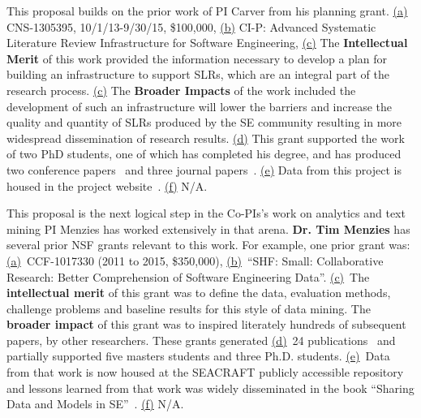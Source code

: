 This proposal builds on the prior work of PI Carver from his planning grant. 
\underline{(a)} CNS-1305395, 10/1/13-9/30/15, \$100,000, 
\underline{(b)} CI-P: Advanced Systematic Literature Review Infrastructure for Software Engineering,
\underline{(c)} The \textbf{Intellectual Merit} of this work provided the information necessary to develop a plan for building an infrastructure to support SLRs, which are an integral part of the research process.
\underline{(c)} The \textbf{Broader Impacts} of the work included the development of such an infrastructure will lower the barriers and increase the quality and quantity of SLRs produced by the SE community resulting in more widespread dissemination of research results.
\underline{(d)} This grant supported the work of two PhD students, one of which has completed his degree, and has produced two conference papers~\cite{Carver-etal:13, Hassler-etal:14} and three journal papers~\cite{Hassler-etal:16,AlZubidy-etal:2017,Al-Zubidy2019}.
\underline{(e)} Data from this project is housed in the project website~\cite{workshop}.
\underline{(f)} N/A.


This proposal is the next logical step in the Co-PIs's work on analytics and text mining
{PI Menzies} has worked extensively in that arena.
\textbf{Dr. Tim Menzies} has several prior NSF  grants relevant to this work.  
For example, one  prior grant was:
 \underline{(a)}~CCF-1017330 (2011 to 2015,  \$350,000),
\underline{(b)}~``SHF: Small: Collaborative Research: Better Comprehension of Software Engineering Data''. 
\underline{(c)}~The {\bf intellectual merit} of this  grant
was  to define the data, evaluation methods, challenge problems and baseline results for this style of data mining.  The {\bf broader impact} of this  grant was to  inspired literately hundreds of subsequent papers,
 by other researchers.
These  grants generated \underline{(d)}~24 publications~\cite{%
Bavota2012a,%
Bavota2013,%
Bavota2012b,%
Haiduc2010a,%
Haiduc2013a,%
Haiduc2012a,%
Haiduc2013b,%
Ohlemacher2011b,%
Scanniello2013,%
Scanniello2011,%
me11m,%
me13a,peters12a} and 
partially supported five masters students and three Ph.D. students. \underline{(e)}~Data from that work is now housed at the SEACRAFT publicly accessible repository~\cite{seacraft} and lessons learned from that work was widely disseminated in the book ``Sharing Data and Models in SE''~\cite{Menzies:2014:SDM:2930830}. \underline{(f)} N/A.  



